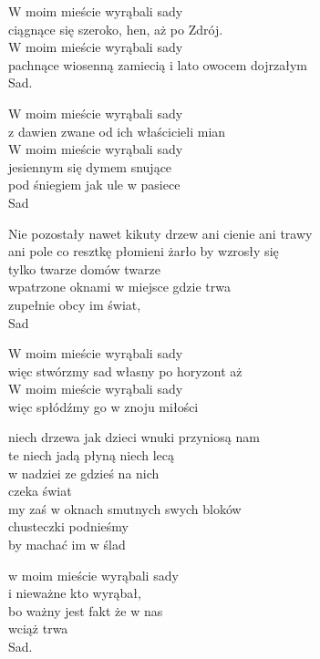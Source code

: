 \begin{text}
    W moim mieście wyrąbali sady\\
    ciągnące się szeroko, hen, aż po Zdrój.\\
    W moim mieście wyrąbali sady\\
    pachnące wiosenną zamiecią i lato owocem dojrzałym\\
    Sad.

    W moim mieście wyrąbali sady\\
    z dawien zwane od ich właścicieli mian\\
    W moim mieście wyrąbali sady\\
    jesiennym się dymem snujące\\
    pod śniegiem jak ule w pasiece\\
    Sad

    Nie pozostały nawet kikuty drzew ani cienie ani trawy\\
    ani pole co resztkę płomieni żarło by wzrosły się\\
    tylko twarze domów twarze\\
    wpatrzone oknami w miejsce gdzie trwa\\
    zupełnie obcy im świat,\\
    Sad

    W moim mieście wyrąbali sady\\
    więc stwórzmy sad własny po horyzont aż\\
    W moim mieście wyrąbali sady\\
    więc spłódźmy go w znoju miłości

    niech drzewa jak dzieci wnuki przyniosą nam\\
    te niech jadą płyną niech lecą\\
    w nadziei ze gdzieś na nich\\
    czeka świat\\
    my zaś w oknach smutnych swych bloków\\
    chusteczki podnieśmy\\
    by machać im w ślad

    w moim mieście wyrąbali sady\\
    i nieważne kto wyrąbał,\\
    bo ważny jest fakt że w nas\\
    wciąż trwa\\
    Sad.
\end{text}
\begin{chord}

\end{chord}
